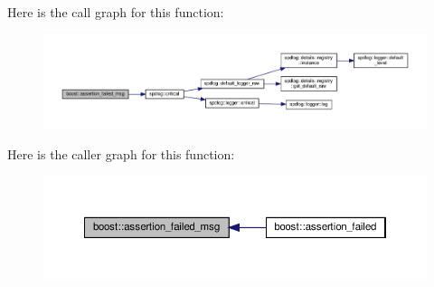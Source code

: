 Here is the call graph for this function\+:
\nopagebreak
\begin{figure}[H]
\begin{center}
\leavevmode
\includegraphics[width=350pt]{namespaceboost_afbd4a259de77230355c3c2de9ce6d6c9_cgraph}
\end{center}
\end{figure}
Here is the caller graph for this function\+:
\nopagebreak
\begin{figure}[H]
\begin{center}
\leavevmode
\includegraphics[width=350pt]{namespaceboost_afbd4a259de77230355c3c2de9ce6d6c9_icgraph}
\end{center}
\end{figure}
